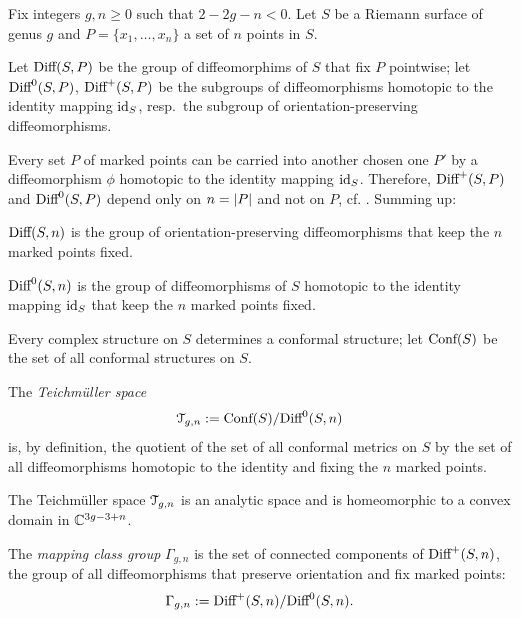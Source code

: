 Fix integers $g,n\geq0$ such that $2 -2g - n < 0$. Let $S$ be a Riemann
surface of genus $g$ and $P = \{ x_1, \ldots, x_n \}$ a set of $n$ points
in $S$.  

Let $\textrm{Diff}(S,P)$ be the group of diffeomorphims of $S$ that fix $P$
pointwise;%
let $\textrm{Diff}^0(S,P)$, $\textrm{Diff}^+(S,P)$ be the subgroups of diffeomorphisms
homotopic to the identity mapping $\operatorname{id}_S$, resp.\ the subgroup of
orientation-preserving diffeomorphisms.

Every set $P$ of marked points can be carried into another chosen one
$P'$ by a diffeomorphism $\phi$ homotopic to the identity mapping
$\operatorname{id}_S$.  Therefore, $\textrm{Diff}^+(S,P)$ and $\textrm{Diff}^0(S, P)$ depend only on
$n = \lvert P\rvert$ and not on $P$, cf. \cite{krushkal;riemann-surfaces}.
Summing up:
\begin{definition}\label{dfn:diff}
  $\textrm{Diff}(S,n)$ is the group of orientation-preserving diffeomorphisms
  that keep the $n$ marked points fixed.

  $\textrm{Diff}^0(S,n)$ is the group of diffeomorphisms of $S$ homotopic to
  the identity mapping $\operatorname{id}_S$ that keep the $n$ marked points fixed.
\end{definition}

Every complex structure  on $S$ determines a conformal structure; let
$\text{\rm Conf}(S)$ be the set of all conformal structures on $S$. 
\begin{definition}\label{dfn:teichmuller}
  The \emph{Teichm{\"u}ller space}
  \begin{equation*}
    \mathcal{T}_{g,n} := \text{\rm Conf}(S) / \textrm{Diff}^0(S, n)
  \end{equation*}
  is, by definition, the quotient of the set of all conformal metrics on
  $S$ by the set of all diffeomorphisms homotopic to the identity and
  fixing the $n$ marked points.
\end{definition}
The Teichm{\"u}ller space $\mathcal{T}_{g,n}$ is an analytic space and is
homeomorphic to a convex domain in $\mathbb{C}^{3g - 3 + n}$.

\begin{definition}\label{dfn:mapping-class-group}
  The \emph{mapping class group} $\Gamma_{g,n}$ is the set of connected
  components of $\textrm{Diff}^+(S, n)$, the group of all diffeomorphisms that
  preserve orientation and fix marked points:
  \begin{equation*}
    \Gamma_{g,n} := \textrm{Diff}^+ (S, n) / \textrm{Diff}^0(S, n).
  \end{equation*}
\end{definition}


